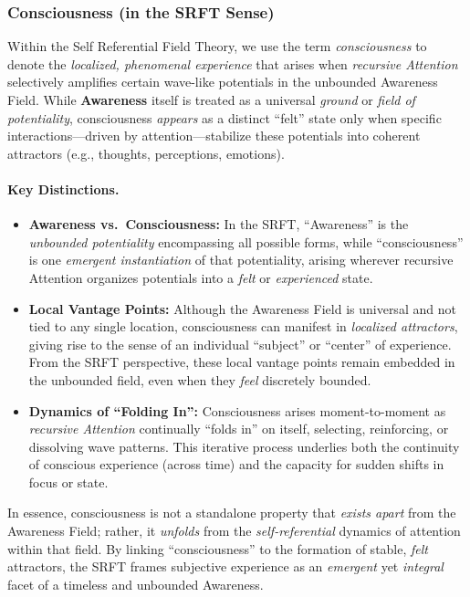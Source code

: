 \documentclass[12pt,a4paper]{article}
\begin{document}
\subsubsection{Consciousness (in the SRFT Sense)}
\label{subsubsec:consciousness-SRFT}

Within the Self Referential Field Theory, we use the term \emph{consciousness} to denote 
the \emph{localized, phenomenal experience} that arises when \emph{recursive Attention} 
selectively amplifies certain wave-like potentials in the unbounded Awareness Field. 
While \textbf{Awareness} itself is treated as a universal \emph{ground} or 
\emph{field of potentiality}, consciousness \emph{appears} as a distinct “felt” state 
only when specific interactions---driven by attention---stabilize these potentials 
into coherent attractors (e.g., thoughts, perceptions, emotions). 

\paragraph{Key Distinctions.} 
\begin{itemize}
    \item \textbf{Awareness vs.\ Consciousness:} 
    In the SRFT, ``Awareness'' is the \emph{unbounded potentiality} encompassing all possible forms, while “consciousness” is one \emph{emergent 
    instantiation} of that potentiality, arising wherever recursive Attention organizes potentials into a \emph{felt} or \emph{experienced} state.
    
    \item \textbf{Local Vantage Points:} 
    Although the Awareness Field is universal and not tied to any single location, consciousness can manifest in \emph{localized attractors}, giving rise to the sense of an individual “subject” or “center” of experience. From the SRFT perspective, these local vantage points remain embedded in the unbounded field, even when they \emph{feel} discretely bounded.
    
    \item \textbf{Dynamics of “Folding In”:} 
    Consciousness arises moment-to-moment as \emph{recursive Attention} continually “folds in” on itself, selecting, reinforcing, or dissolving wave patterns. This iterative process underlies both the continuity of conscious experience (across time) and the capacity for sudden shifts in focus or state.
\end{itemize}

In essence, consciousness is not a standalone property that \emph{exists apart} from the Awareness Field; rather, it \emph{unfolds} from the \emph{self-referential} dynamics of attention within that field. By linking “consciousness” to the formation of stable, \emph{felt} attractors, the SRFT frames subjective experience as an \emph{emergent} yet \emph{integral} facet of a timeless and unbounded Awareness. 
\end{document}
